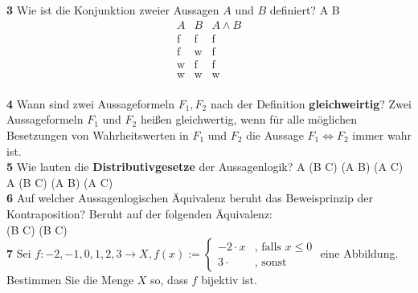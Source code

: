 \documentclass[11pt]{article}
\begin{document}
    \textbf{3} Wie ist die Konjunktion zweier Aussagen $A$ und $B$ definiert?\newline
    A \land B 
    \[
        \begin{array}{c|c|c}
            A & B & A \land B \\
            \hline
            \text{f} & \text{f} & \text{f} \\
            \text{f} & \text{w} & \text{f} \\
            \text{w} & \text{f} & \text{f} \\
            \text{w} & \text{w} & \text{w} \\
        \end{array}
    \]\newline\newline


    \textbf{4} Wann sind zwei Aussageformeln $F_1, F_2$ nach der Definition \textbf{gleichweirtig}?\newline
    Zwei Aussageformeln $F_1$ und $F_2$ heißen gleichwertig, wenn für alle möglichen Besetzungen von Wahrheitswerten in $F_1$ und $F_2$ die Aussage $F_1 \Leftrightarrow F_2$ immer wahr ist.\\

    \textbf{5} Wie lauten die \textbf{Distributivgesetze} der Aussagenlogik?\newline
    A \land (B \lor C) \iff (A \land B) \lor (A \land C)\\
    A \lor (B \land C) \iff (A \lor B) \land (A \lor C)\\


\textbf{6} Auf welcher Aussagenlogischen Äquivalenz beruht das Beweisprinzip der Kontraposition?\newline
    Beruht auf der folgenden Äquivalenz:\\
    (B \Rightarrow C) \Leftrightarrow (\neg B \Leftarrow \neg C)\\

    \textbf{7} Sei $f : {-2,-1,0,1,2,3} \rightarrow X, f(x) :=  \begin{cases}
                                                                    -2 \cdot x & \text{, falls $x \leq 0$} \\
                                                                    3 \cdot & \text{, sonst}
    \end{cases}$ eine Abbildung. Bestimmen Sie die Menge $X$ so, dass $f$ bijektiv ist.\newline
\end{document}
